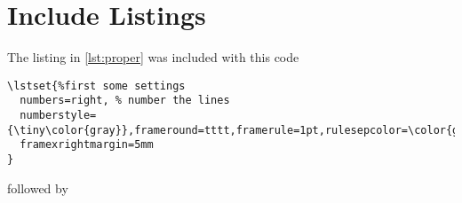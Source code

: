 \chapter{Include Listings}

The listing in \vref{lst:proper} was included with this code

\begin{lstlisting}
\lstset{%first some settings
  numbers=right, % number the lines
  numberstyle={\tiny\color{gray}},frameround=tttt,framerule=1pt,rulesepcolor=\color{gray},
  framexrightmargin=5mm
}
\end{lstlisting}

followed by

\begin{lstlisting}
  
\end{lstlisting}
      
